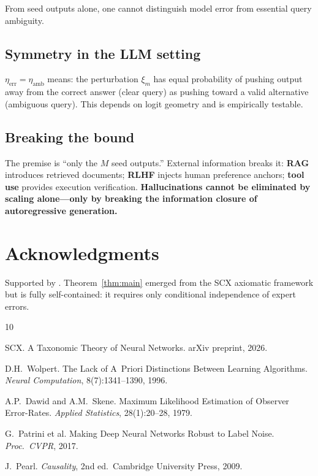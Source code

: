 \documentclass[10pt,a4paper]{article}
\theoremstyle{definition}
\theoremstyle{remark}
\begin{document}
From seed outputs alone, one cannot distinguish model error from essential query ambiguity.

\subsection*{Symmetry in the LLM setting}

$\eta_{\text{err}}=\eta_{\text{amb}}$ means: the perturbation $\xi_m$ has equal probability
of pushing output away from the correct answer (clear query) as pushing toward a valid
alternative (ambiguous query).  This depends on logit geometry and is empirically testable.

\subsection*{Breaking the bound}

The premise is ``only the $M$ seed outputs.''  External information breaks it:
\textbf{RAG} introduces retrieved documents; \textbf{RLHF} injects human preference anchors;
\textbf{tool use} provides execution verification.
\textbf{Hallucinations cannot be eliminated by scaling alone---only by breaking
the information closure of autoregressive generation.}

\section*{Acknowledgments}

Supported by .  Theorem~\ref{thm:main} emerged from the SCX
axiomatic framework \cite{scx2026} but is fully self-contained: it requires only conditional
independence of expert errors.

\begin{thebibliography}{10}

SCX.
\newblock A Taxonomic Theory of Neural Networks.
\newblock arXiv preprint, 2026.

D.H.\ Wolpert.
\newblock The Lack of A~Priori Distinctions Between Learning Algorithms.
\newblock \textit{Neural Computation}, 8(7):1341--1390, 1996.

A.P.\ Dawid and A.M.\ Skene.
\newblock Maximum Likelihood Estimation of Observer Error-Rates.
\newblock \textit{Applied Statistics}, 28(1):20--28, 1979.

G.\ Patrini et al.
\newblock Making Deep Neural Networks Robust to Label Noise.
\newblock \textit{Proc.\ CVPR}, 2017.

J.\ Pearl.
\newblock \textit{Causality}, 2nd ed.\ Cambridge University Press, 2009.

\end{thebibliography}
\end{document}

